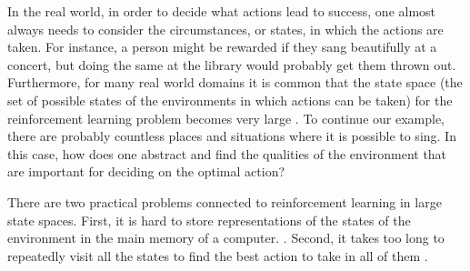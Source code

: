 In the real world, in order to decide what actions lead to success, one almost always needs to consider the circumstances, or states, in which the actions are taken. For instance, a person might be rewarded if they sang beautifully at a concert, but doing the same at the library would probably get them thrown out. Furthermore, for many real world domains it is common that the state space (the set of possible states of the environments in which actions can be taken) for the reinforcement learning problem becomes very large \parencite{guestrin2003efficient}. To continue our example, there are probably countless places and situations where it is possible to sing. In this case, how does one abstract and find the qualities of the environment that are important for deciding on the optimal action?


There are two practical problems connected to reinforcement learning in large state spaces. First, it is hard to store representations of the states of the environment in the main memory of a computer.  \parencite{szepesvari2010algorithms}. Second, it takes too long to repeatedly visit all the states to find the best action to take in all of them \parencite{dietterich2013pac}.
